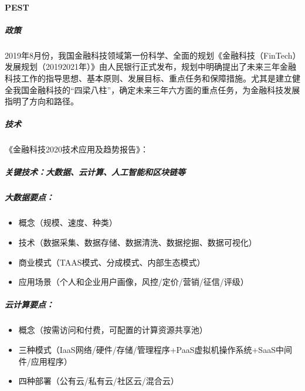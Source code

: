 \documentclass[letterpaper,11pt,english]{sphinxmanual}
\begin{document}
\begin{center}
{{\paragraph{PEST}
\label{\detokenize{chapter_AI+Finance/FinTech:pest}}

\subparagraph{政策}
\label{\detokenize{chapter_AI+Finance/FinTech:id8}}
2019年8月份，我国金融科技领域第一份科学、全面的规划《金融科技（FinTech）发展规划（2019\sphinxhyphen{}2021年）》由人民银行正式发布，规划中明确提出了未来三年金融科技工作的指导思想、基本原则、发展目标、重点任务和保障措施。尤其是建立健全我国金融科技的“四梁八柱”，确定未来三年六方面的重点任务，为金融科技发展指明了方向和路径。%
\begin{footnote}[951]\sphinxAtStartFootnote
{}
%
\end{footnote}


\subparagraph{技术}
\label{\detokenize{chapter_AI+Finance/FinTech:id9}}
《金融科技2020技术应用及趋势报告》：


\subparagraph{关键技术：大数据、云计算、人工智能和区块链等}
\label{\detokenize{chapter_AI+Finance/FinTech:id10}}

\subparagraph{大数据要点：}
\label{\detokenize{chapter_AI+Finance/FinTech:id11}}\begin{itemize}
\item {} 
概念（规模、速度、种类）

\item {} 
技术（数据采集、数据存储、数据清洗、数据挖掘、数据可视化）

\item {} 
商业模式（TAAS模式、分成模式、内部生态模式）

\item {} 
应用场景（个人和企业用户画像，风控/定价/营销/征信/评级）

\end{itemize}


\subparagraph{云计算要点：}
\label{\detokenize{chapter_AI+Finance/FinTech:id12}}\begin{itemize}
\item {} 
概念（按需访问和付费，可配置的计算资源共享池）

\item {} 
三种模式（IaaS网络/硬件/存储/管理程序+PaaS虚拟机操作系统+SaaS中间件/应用程序）

\item {} 
四种部署（公有云/私有云/社区云/混合云）


\end{itemize}}}
\end{center}
\end{document}
